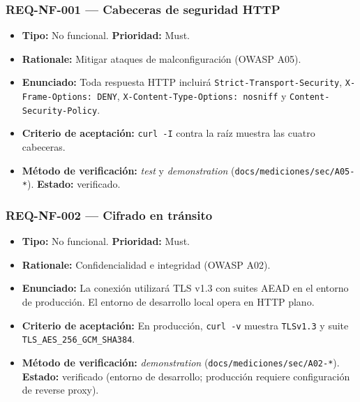 \documentclass[12pt,a4paper]{article}
\begin{document}
\subsubsection{REQ-NF-001 — Cabeceras de seguridad HTTP}
\begin{itemize}
  \item \textbf{Tipo:} No funcional. \textbf{Prioridad:} Must.
  \item \textbf{Rationale:} Mitigar ataques de malconfiguración (OWASP A05).
  \item \textbf{Enunciado:} Toda respuesta HTTP incluirá \texttt{Strict-Transport-Security},
  \texttt{X-Frame-Options: DENY}, \texttt{X-Content-Type-Options: nosniff} y
  \texttt{Content-Security-Policy}.
  \item \textbf{Criterio de aceptación:} \texttt{curl -I} contra la raíz muestra las cuatro
  cabeceras.
  \item \textbf{Método de verificación:} \textit{test} y \textit{demonstration}
  (\texttt{docs/mediciones/sec/A05-*}). \textbf{Estado:} verificado.
\end{itemize}

\subsubsection{REQ-NF-002 — Cifrado en tránsito}
\begin{itemize}
  \item \textbf{Tipo:} No funcional. \textbf{Prioridad:} Must.
  \item \textbf{Rationale:} Confidencialidad e integridad (OWASP A02).
  \item \textbf{Enunciado:} La conexión utilizará TLS v1.3 con suites AEAD en el entorno de
  producción. El entorno de desarrollo local opera en HTTP plano.
  \item \textbf{Criterio de aceptación:} En producción, \texttt{curl -v} muestra
  \texttt{TLSv1.3} y suite \texttt{TLS\_AES\_256\_GCM\_SHA384}.
  \item \textbf{Método de verificación:} \textit{demonstration}
  (\texttt{docs/mediciones/sec/A02-*}). \textbf{Estado:} verificado (entorno de desarrollo;
  producción requiere configuración de reverse proxy).
\end{itemize}
\end{document}
